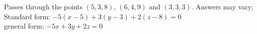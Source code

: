 {Passes through the points $(5,3,8)$, $(6,4,9)$ and $(3,3,3)$.
}
{Answers may vary;\\
Standard form: $-5(x-5)+3(y-3)+2(z-8)=0$\\
general form: $-5x+3y+2z=0$
}

